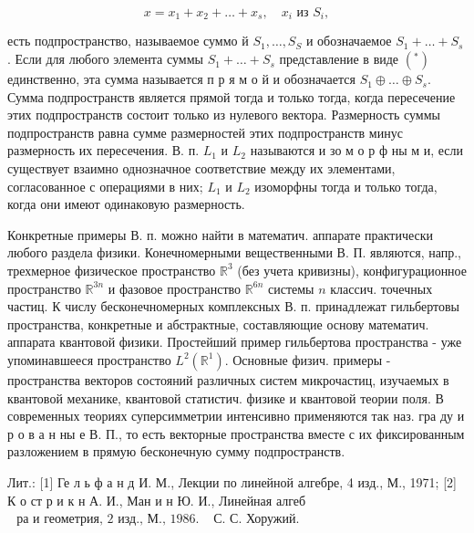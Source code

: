 \documentclass[10pt]{article}
\begin{document}
\[

x=x_{1}+x_{2}+\ldots+x_{s}, \quad x_{i} \text { из } S_{i},

\]



есть подпространство, называемое суммо й $S_{1}, \ldots, S_{S}$ и обозначаемое $S_{1}+\ldots+S_{s}$. Если для любого элемента суммы $S_{1}+\ldots+S_{s}$ представление в виде $\left({ }^{*}\right)$ единственно, эта сумма называется п р я м о й и обозначается $S_{1} \oplus \ldots \oplus S_{s}$. Сумма подпространств является прямой тогда и только тогда, когда пересечение этих подпространств состоит только из нулевого вектора. Размерность суммы подпространств равна сумме размерностей этих подпространств минус размерность их пересечения. В. п. $L_{1}$ и $L_{2}$ называются и зо м о р ф ны м и, если существует взаимно однозначное соответствие между их элементами, согласованное с операциями в них; $L_{1}$ и $L_{2}$ изоморфны тогда и только тогда, когда они имеют одинаковую размерность.



Конкретные примеры В. п. можно найти в математич. аппарате практически любого раздела физики. Конечномерными вещественными В. П. являются, напр., трехмерное физическое пространство $\mathbb{R}^{3}$ (без учета кривизны), конфигурационное пространство $\mathbb{R}^{3 n}$ и фазовое пространство $\mathbb{R}^{6 n}$ системы $n$ классич. точечных частиц. К числу бесконечномерных комплексных В. п. принадлежат гильбертовы пространства, конкретные и абстрактные, составляющие основу математич. аппарата квантовой физики. Простейший пример гильбертова пространства - уже упоминавшееся пространство $L^{2}\left(\mathbb{R}^{1}\right)$. Основные физич. примеры - пространства векторов состояний различных систем микрочастиц, изучаемых в квантовой механике, квантовой статистич. физике и квантовой теории поля. В современных теориях суперсимметрии интенсивно применяются так наз. гра ду и р о в а н ны е В. П., то есть векторные пространства вместе с их фиксированным разложением в прямую бесконечную сумму подпространств.



Лит.: [1] Ге л ь ф а н д И. М., Лекции по линейной алгебре, 4 изд., М., 1971; [2] К о ст р и к н А. И., Ман и н Ю. И., Линейная алгеб$\begin{array}{ll}\text { ра и геометрия, } 2 \text { изд., М., } 1986 . & \text { С. С. Хоружий. }\end{array}$
\end{document}
